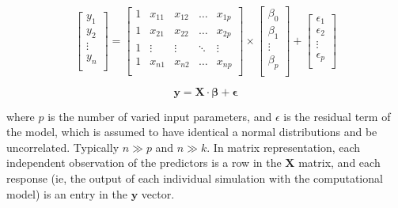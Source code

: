 \documentclass[12pt]{article}
\begin{document}
{\[ \label{eq:MLR_model}
\begin{bmatrix} 
y_{1}  \\
y_{2}  \\
\vdots  \\
y_{n} \\
\end{bmatrix}
=
\begin{bmatrix} 
1 & x_{11} & x_{12} & \dots & x_{1p} \\
1 & x_{21} & x_{22} & \dots & x_{2p} \\
1 & \vdots & \vdots & \ddots & \vdots \\
1 & x_{n1} & x_{n2} & \dots & x_{np} \\
\end{bmatrix}
\times
\begin{bmatrix}
\beta_{0} \\
\beta_{1} \\
\vdots \\
\beta_{p} \\
\end{bmatrix}
+
\begin{bmatrix}
\epsilon_{1} \\
\epsilon_{2} \\
\vdots \\
\epsilon_{p} \\
\end{bmatrix}
\] 

\begin{equation} \label{eq:Linear_Regression1}
\mathbf{y} = \mathbf{X} \cdot \mathbf{\beta}+ \mathbf{\epsilon}
\end{equation}

\vspace{0.5cm}

where $p$ is the number of varied input parameters, and $\epsilon$ is the residual term of the model, which is assumed to have identical a normal distributions and be uncorrelated. Typically $n\gg p$ and $n\gg k$. In matrix representation, each independent observation of the predictors is a row in the $\mathbf{X}$ matrix, and each response (ie, the output of each individual simulation with the computational model) is an entry in the $\mathbf{y}$ vector.


}
\end{document}
